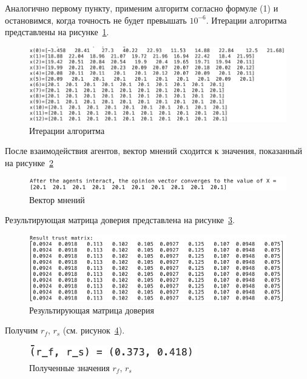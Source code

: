 Аналогично первому пункту, применим алгоритм согласно формуле (1) и остановимся, когда точность не будет
превышать $10^{-6}$. Итерации алгоритма представлены на рисунке~\ref{fig:fig07}.

\begin{figure}
  \centering
  \includegraphics[scale=0.6]{../../artifacts/rk3/7.png}
  \caption{Итерации алгоритма}
  \label{fig:fig07}
\end{figure}

После взаимодействия агентов, вектор мнений сходится к значения, показанный на рисунке~\ref{fig:fig08}

\begin{figure}
  \centering
  \includegraphics[scale=0.6]{../../artifacts/rk3/8.png}
  \caption{Вектор мнений}
  \label{fig:fig08}
\end{figure}

Результирующая матрица доверия представлена на рисунке~\ref{fig:fig09}.

\begin{figure}
  \centering
  \includegraphics[scale=0.6]{../../artifacts/rk3/9.png}
  \caption{Результирующая матрица доверия}
  \label{fig:fig09}
\end{figure}

Получим $r_f$, $r_s$ (см. рисунок~\ref{fig:fig10}).

\begin{figure}
  \centering
  \includegraphics[scale=0.6]{../../artifacts/rk3/10.png}
  \caption{Полученные значения $r_f$, $r_s$}
  \label{fig:fig10}
\end{figure}

